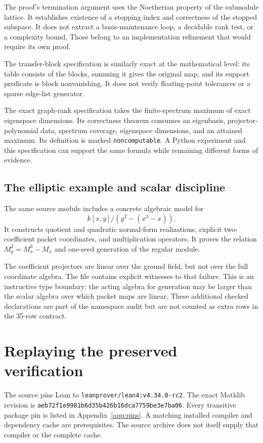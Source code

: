 \documentclass[11pt,a4paper]{article}
\newcommand{\code}[1]{\nolinkurl{#1}}
\begin{document}
The proof's termination argument uses the Noetherian property of the submodule lattice. It establishes existence of a stopping index and correctness of the stopped subspace. It does not extract a basis-maintenance loop, a decidable rank test, or a complexity bound. Those belong to an implementation refinement that would require its own proof.

The transfer-block specification is similarly exact at the mathematical level: its table consists of the blocks, summing it gives the original map, and its support predicate is block nonvanishing. It does not verify floating-point tolerances or a sparse edge-list generator.

The exact graph-rank specification takes the finite-spectrum maximum of exact eigenspace dimensions. Its correctness theorem consumes an eigenbasis, projector-polynomial data, spectrum coverage, eigenspace dimensions, and an attained maximum. Its definition is marked \code{noncomputable}. A Python experiment and this specification can support the same formula while remaining different forms of evidence.

\subsection{The elliptic example and scalar discipline}

The same source module includes a concrete algebraic model for
\[
k[x,y]/(y^2-(x^3-x)).
\]
It constructs quotient and quadratic normal-form realizations, explicit two-coefficient packet coordinates, and multiplication operators. It proves the relation $M_y^2=M_x^3-M_x$ and one-seed generation of the regular module.

The coefficient projectors are linear over the ground field, but not over the full coordinate algebra. The file contains explicit witnesses to that failure. This is an instructive type boundary: the acting algebra for generation may be larger than the scalar algebra over which packet maps are linear. These additional checked declarations are part of the namespace audit but are not counted as extra rows in the 35-row contract.

\section{Replaying the preserved verification}\label{sec:replay}

The source pins Lean to \code{leanprover/lean4:v4.34.0-rc2}. The exact Mathlib revision is \code{aeb72f1e9981b6d35b426b16dca7759be3e7ba06}. Every transitive package pin is listed in Appendix~\ref{app:pins}. A matching installed compiler and dependency cache are prerequisites. The source archive does not itself supply that compiler or the complete cache.
\end{document}
